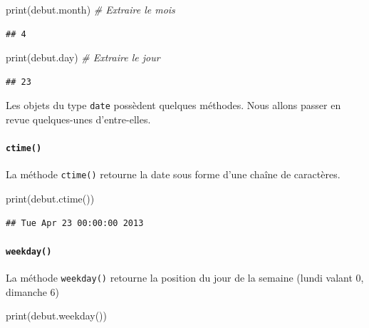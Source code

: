 \documentclass[
  12pt,
]{book}
\newenvironment{Shaded}{\begin{snugshade}}{\end{snugshade}}
\newcommand{\BuiltInTok}[1]{#1}
\newcommand{\CommentTok}[1]{\textcolor[rgb]{0.56,0.35,0.01}{\textit{#1}}}
\newcommand{\NormalTok}[1]{#1}
\numberwithin{equation}{section}
\numberwithin{countremarque}{section}
\begin{document}
\begin{Shaded}
\begin{Highlighting}[]
\BuiltInTok{print}\NormalTok{(debut.month) }\CommentTok{\# Extraire le mois}
\end{Highlighting}
\end{Shaded}

\begin{lstlisting}
## 4
\end{lstlisting}

\begin{Shaded}
\begin{Highlighting}[]
\BuiltInTok{print}\NormalTok{(debut.day) }\CommentTok{\# Extraire le jour}
\end{Highlighting}
\end{Shaded}

\begin{lstlisting}
## 23
\end{lstlisting}

Les objets du type \texttt{date} possèdent quelques méthodes. Nous allons passer en revue quelques-unes d'entre-elles.

\paragraph{\texorpdfstring{\texttt{ctime()}}{ctime()}}\label{ctime}

La méthode \texttt{ctime()} retourne la date sous forme d'une chaîne de caractères.

\begin{Shaded}
\begin{Highlighting}[]
\BuiltInTok{print}\NormalTok{(debut.ctime())}
\end{Highlighting}
\end{Shaded}

\begin{lstlisting}
## Tue Apr 23 00:00:00 2013
\end{lstlisting}

\paragraph{\texorpdfstring{\texttt{weekday()}}{weekday()}}\label{weekday}

La méthode \texttt{weekday()} retourne la position du jour de la semaine (lundi valant 0, dimanche 6)

\begin{Shaded}
\begin{Highlighting}[]
\BuiltInTok{print}\NormalTok{(debut.weekday())}
\end{Highlighting}
\end{Shaded}
\end{document}
